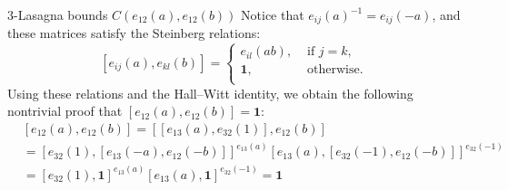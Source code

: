 \documentclass[12pt]{beamer}
\begin{document}
\begin{frame}{$3$-Lasagna bounds $C(e_{12}(a),e_{12}(b))$}
  \pause
  Notice that $e_{ij}(a)^{-1}=e_{ij}(-a)$, and these matrices satisfy the Steinberg relations:
  \[
    [e_{ij}(a),e_{kl}(b)]=\begin{cases}
      e_{il}(ab), &\text{ if } j=k,\\
      \mathbf{1}, &\text{ otherwise. }\\
    \end{cases}
  \]
  \pause
  Using these relations and the Hall--Witt identity, we obtain the following nontrivial proof that $[e_{12}(a),e_{12}(b)]=\mathbf{1}$:
  {\begin{eqnarray*}
    &[e_{12}(a),e_{12}(b)]=[[e_{13}(a),e_{32}(1)],e_{12}(b)]\\
    &=[e_{32}(1),[e_{13}(-a),e_{12}(-b)]]^{e_{13}(a)}[e_{13}(a),[e_{32}(-1),e_{12}(-b)]]^{e_{32}(-1)}\\
    &=[e_{32}(1),\mathbf{1}]^{e_{13}(a)}[e_{13}(a),\mathbf{1}]^{e_{32}(-1)}=\mathbf{1} 
  \end{eqnarray*}}
\end{frame}
\end{document}
